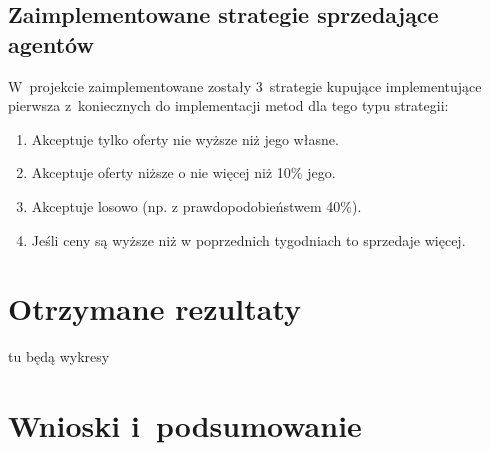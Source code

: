 \documentclass[12pt]{article}
\begin{document}
\subsection{Zaimplementowane strategie sprzedające agentów}
W~projekcie zaimplementowane zostały 3~strategie kupujące implementujące pierwsza z~koniecznych do implementacji metod dla tego typu strategii:

\begin{enumerate}
 \item Akceptuje tylko oferty nie wyższe niż jego własne.
 \item Akceptuje oferty niższe o nie więcej niż 10\% jego.
 \item Akceptuje losowo (np. z prawdopodobieństwem 40\%).
 \item Jeśli ceny są wyższe niż w poprzednich tygodniach to sprzedaje więcej.
\end{enumerate}


\section{Otrzymane rezultaty}\label{chapter: rezultaty}
tu będą wykresy
\section{Wnioski i~podsumowanie}
\end{document}
